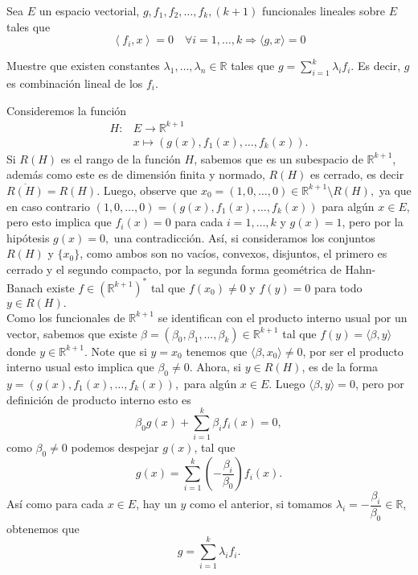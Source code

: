  Sea $E$ un espacio vectorial, $g, f_1, f_2, \ldots, f_k,(k+1)$ funcionales lineales sobre $E$ tales que
$$
\left\langle f_i, x\right\rangle=0 \quad \forall i=1, \ldots, k \Longrightarrow\langle g, x\rangle=0
$$

Muestre que existen constantes $\lambda_1, \ldots, \lambda_n \in \mathbb{R}$ tales que $g=\sum_{i=1}^k \lambda_i f_i$. Es decir, $g$ es combinación lineal de los $f_i$.
\begin{sproof}
    Consideremos la función
    \begin{align*}
        H:&E\to \mathbb{R}^{k+1}\\
        &x\mapsto(g(x),f_1(x),\ldots,f_k(x)).
    \end{align*}
    Si $R(H)$ es el rango de la función $H$, sabemos que es un subespacio de $\mathbb{R}^{k+1}$, además como este es de dimensión finita y normado, $R(H)$ es cerrado, es decir $\overline{R(H)}=R(H).$ Luego, observe que $x_0=(1,0,\ldots,0)\in \mathbb{R}^{k+1}\setminus R(H),$ ya que en caso contrario $(1,0,\ldots,0)=(g(x),f_1(x),\ldots,f_k(x))$ para algún $x\in E$, pero esto implica que $f_i(x)=0$ para cada $i=1,\ldots,k$ y $g(x)=1$, pero por la hipótesis $g(x)=0,$ una contradicción. Así, si consideramos los conjuntos $R(H)$ y $\{x_0\}$, como ambos son no vacíos, convexos, disjuntos, el primero es cerrado y el segundo compacto, por la segunda forma geométrica de Hahn-Banach existe $f\in (\mathbb{R}^{k+1})^*$ tal que $f(x_0)\neq 0$ y $f(y)=0$ para todo $y\in R(H).$\\

    Como los funcionales de $\mathbb{R}^{k+1}$ se identifican con el producto interno usual por un vector, sabemos que existe $\beta=(\beta_0,\beta_1,\ldots,\beta_k)\in \mathbb{R}^{k+1}$ tal que $f(y)=\langle \beta,y\rangle$ donde $y\in \mathbb{R}^{k+1}.$ Note que si $y=x_0$ tenemos que $\langle \beta,x_0\rangle\neq 0$, por ser el producto interno usual esto implica que $\beta_0\neq 0.$ Ahora, si $y\in R(H)$, es de la forma $y=(g(x),f_1(x),\ldots,f_k(x)),$ para algún $x\in E.$ Luego $\langle \beta,y\rangle=0$, pero por definición de producto interno esto es 
    $$\beta_0g(x)+\sum_{i=1}^k\beta_if_i(x)=0,$$
    como $\beta_0\neq 0$ podemos despejar $g(x)$, tal que
    $$g(x)=\sum_{i=1}^k\left(-\frac{\beta_i}{\beta_0}\right)f_i(x).$$
    Así como para cada $x\in E$, hay un $y$ como el anterior, si tomamos $\lambda_i=-\dfrac{\beta_i}{\beta_0}\in \mathbb{R}$, obtenemos que
    $$g=\sum_{i=1}^k \lambda_i f_i.$$
\end{sproof}